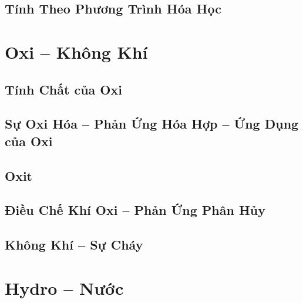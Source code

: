 \documentclass{article}
\numberwithin{equation}{section}
\begin{document}
\subsection{Tính Theo Phương Trình Hóa Học}


\section{Oxi -- Không Khí}

\subsection{Tính Chất của Oxi}


\subsection{Sự Oxi Hóa -- Phản Ứng Hóa Hợp -- Ứng Dụng của Oxi}


\subsection{Oxit}


\subsection{Điều Chế Khí Oxi -- Phản Ứng Phân Hủy}


\subsection{Không Khí -- Sự Cháy}


\section{Hydro -- Nước}
\end{document}
